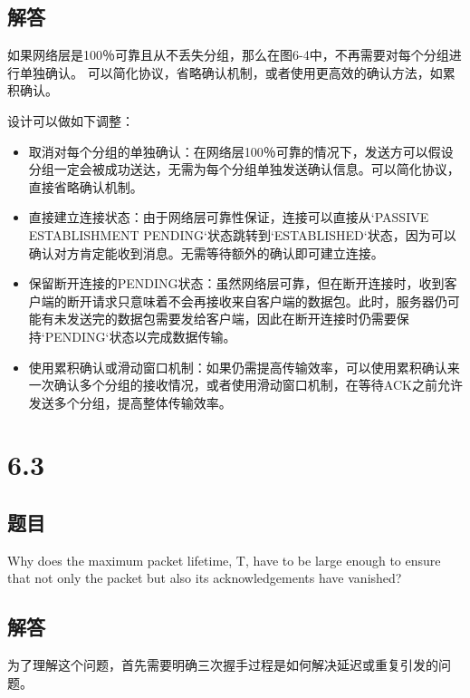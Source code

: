\documentclass[14pt,a4paper,UTF8,twoside]{article}
\begin{document}
\subsection*{解答}

如果网络层是100％可靠且从不丢失分组，那么在图6-4中，不再需要对每个分组进行单独确认。
可以简化协议，省略确认机制，或者使用更高效的确认方法，如累积确认。

设计可以做如下调整：

\begin{cth}
\begin{itemize}
    \item 取消对每个分组的单独确认：在网络层100％可靠的情况下，发送方可以假设分组一定会被成功送达，无需为每个分组单独发送确认信息。可以简化协议，直接省略确认机制。
    \item 直接建立连接状态：由于网络层可靠性保证，连接可以直接从`PASSIVE ESTABLISHMENT PENDING`状态跳转到`ESTABLISHED`状态，因为可以确认对方肯定能收到消息。无需等待额外的确认即可建立连接。
    \item 保留断开连接的PENDING状态：虽然网络层可靠，但在断开连接时，收到客户端的断开请求只意味着不会再接收来自客户端的数据包。此时，服务器仍可能有未发送完的数据包需要发给客户端，因此在断开连接时仍需要保持`PENDING`状态以完成数据传输。
    \item 使用累积确认或滑动窗口机制：如果仍需提高传输效率，可以使用累积确认来一次确认多个分组的接收情况，或者使用滑动窗口机制，在等待ACK之前允许发送多个分组，提高整体传输效率。
\end{itemize}
\end{cth}

\section{6.3}

\subsection*{题目}

Why does the maximum packet lifetime, T, have to be large enough to ensure that not only the packet but also its acknowledgements have vanished?

\subsection*{解答}

为了理解这个问题，首先需要明确三次握手过程是如何解决延迟或重复引发的问题。
\end{document}
